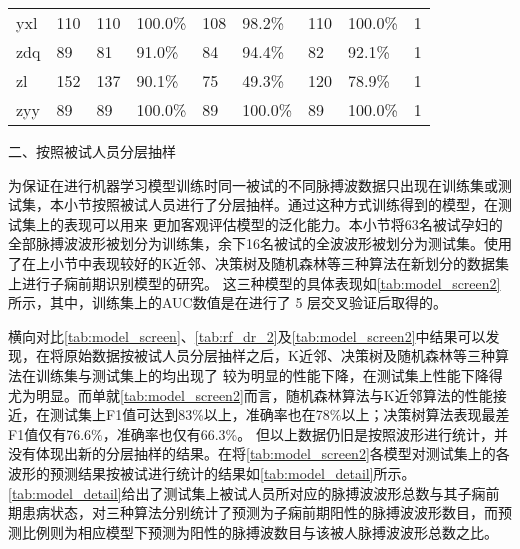 \begin{landscape}
\begin{longtable}{m{2cm}<{\centering}m{2cm}<{\centering}m{2cm}<{\centering}m{2cm}<{\centering}m{2cm}<{\centering}m{2cm}<{\centering}m{2cm}<{\centering}m{2cm}<{\centering}m{2cm}<{\centering}}
            yxl                   & 110                   & 110        & 100.0\%    & 108        & 98.2\%     & 110        & 100.0\%     & 1                                                                      \\
            zdq                   & 89                    & 81         & 91.0\%     & 84         & 94.4\%     & 82         & 92.1\%      & 1                                                                      \\
            zl                    & 152                   & 137        & 90.1\%     & 75         & 49.3\%     & 120        & 78.9\%      & 1                                                                      \\
            zyy                   & 89                    & 89         & 100.0\%    & 89         & 100.0\%    & 89         & 100.0\%     & 1                                                                       \\    
      \end{longtable}
\end{landscape}


二、按照被试人员分层抽样

为保证在进行机器学习模型训练时同一被试的不同脉搏波数据只出现在训练集或测试集，本小节按照被试人员进行了分层抽样。通过这种方式训练得到的模型，在测试集上的表现可以用来
更加客观评估模型的泛化能力。本小节将63名被试孕妇的全部脉搏波波形被划分为训练集，余下16名被试的全波波形被划分为测试集。使用了在上小节中表现较好的K近邻、决策树及随机森林等三种算法在新划分的数据集上进行子痫前期识别模型的研究。
这三种模型的具体表现如\autoref{tab:model_screen2}所示，其中，训练集上的AUC数值是在进行了 5 层交叉验证后取得的。

横向对比\autoref{tab:model_screen}、\autoref{tab:rf_dr_2}及\autoref{tab:model_screen2}中结果可以发现，在将原始数据按被试人员分层抽样之后，K近邻、决策树及随机森林等三种算法在训练集与测试集上的均出现了
较为明显的性能下降，在测试集上性能下降得尤为明显。而单就\autoref{tab:model_screen2}而言，随机森林算法与K近邻算法的性能接近，在测试集上F1值可达到83\%以上，准确率也在78\%以上；决策树算法表现最差F1值仅有76.6\%，准确率也仅有66.3\%。
但以上数据仍旧是按照波形进行统计，并没有体现出新的分层抽样的结果。在将\autoref{tab:model_screen2}各模型对测试集上的各波形的预测结果按被试进行统计的结果如\autoref{tab:model_detail}所示。
\autoref{tab:model_detail}给出了测试集上被试人员所对应的脉搏波波形总数与其子痫前期患病状态，对三种算法分别统计了预测为子痫前期阳性的脉搏波波形数目，而预测比例则为相应模型下预测为阳性的脉搏波数目与该被人脉搏波波形总数之比。

